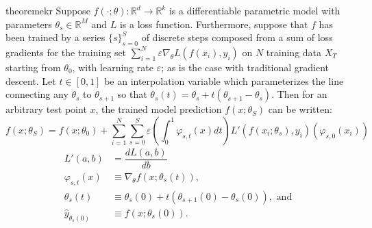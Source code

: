 \begin{restatable}{theorem}{ekr}
\label{thm:ekr}
Suppose $f(\cdot; \theta): \mathbb{R}^d \rightarrow \mathbb{R}^k$ is a differentiable parametric model with parameters $\theta_s \in \mathbb{R}^M$ and $L$ is a loss function. Furthermore, suppose that $f$ has been trained by a series $\{s\}_{s=0}^S$ of discrete steps composed from a sum of loss gradients for the training set $ \sum_{i=1}^N \varepsilon \nabla_\theta L(f(x_i), y_i)$ on $N$ training data $X_T$ starting from $\theta_0$, with learning rate $\varepsilon$; as is the case with traditional gradient descent. Let $t \in [0, 1]$ be an interpolation variable which parameterizes the line connecting any $\theta_s$ to $\theta_{s+1}$ so that $\theta_s(t) = \theta_s + t(\theta_{s+1} - \theta_s)$. Then for an arbitrary test point $x$, the trained model prediction $f(x; \theta_S)$ can be written:
\begin{equation}
f(x; \theta_S) = f(x; \theta_0) + \sum_{i=1}^N \sum_{s=0}^S \varepsilon \left(\int_0^1 \varphi_{s,t}(x) dt\right) L'(f(x_i; \theta_s), y_i) \left(\varphi_{s, 0}(x_i)\right)
\label{exact}
\end{equation}
\begin{align}
    L'(a, b) &= \dfrac{dL(a, b)}{d b}\\
    \varphi_{s,t}(x) &\equiv \nabla_\theta f(x; \theta_s(t)), \\
    \theta_s(t) &\equiv \theta_s(0) + t(\theta_{s+1}(0)-\theta_s(0)), \text{ and}\\
    \hat y_{\theta_s(0)} &\equiv f(x; \theta_s(0)).
\end{align}
\end{restatable}
\vspace{-0.25cm}
